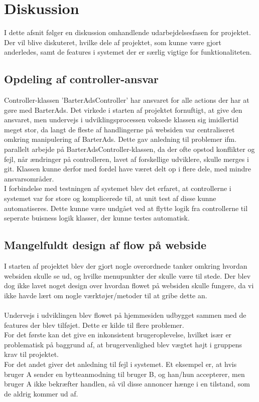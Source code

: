 \chapter{Diskussion}
I dette afsnit følger en diskussion omhandlende udarbejdelsesfasen for projektet. Der vil blive diskuteret, hvilke dele af projektet, som kunne være gjort anderledes, samt de features i systemet der er særlig vigtige for funktionaliteten.

\section{Opdeling af controller-ansvar}
Controller-klassen 'BarterAdsController' har ansvaret for alle actions der har at gøre med BarterAds. Det virkede i starten af projektet fornuftigt, at give den ansvaret, men undervejs i udviklingsprocessen voksede klassen sig imidlertid meget stor, da langt de fleste af handlingerne på websiden var centraliseret omkring manipulering af BarterAds. Dette gav anledning til problemer ifm. parallelt arbejde på BarterAdsController-klassen, da der ofte opstod konflikter og fejl, når ændringer på controlleren, lavet af forskellige udviklere, skulle merges i git. Klassen kunne derfor med fordel have været delt op i flere dele, med mindre ansvarsområder. \\
I forbindelse med testningen af systemet blev det erfaret, at controllerne i systemet var for store og komplicerede til, at unit test af disse kunne automatiseres. Dette kunne være undgået ved at flytte logik fra controllerne til seperate buisness logik klasser, der kunne testes automatisk.

\section{Mangelfuldt design af flow på webside}
I starten af projektet blev der gjort nogle overordnede tanker omkring hvordan websiden skulle se ud, og hvilke menupunkter der skulle være til stede. Der blev dog ikke lavet noget design over hvordan flowet på websiden skulle fungere, da vi ikke havde lært om nogle værktøjer/metoder til at gribe dette an. \\ \\
Undervejs i udviklingen blev flowet på hjemmesiden udbygget sammen med de features der blev tilføjet. Dette er kilde til flere problemer. \\
For det første kan det give en inkonsistent brugeroplevelse, hvilket især er problematisk på baggrund af, at brugervenlighed blev vægtet højt i gruppens krav til projektet. \\
For det andet giver det anledning til fejl i systemet. Et eksempel er, at hvis bruger A sender en bytteanmodning til bruger B, og han/hun accepterer, men bruger A ikke bekræfter handlen, så vil disse annoncer hænge i en tilstand, som de aldrig kommer ud af.\\

